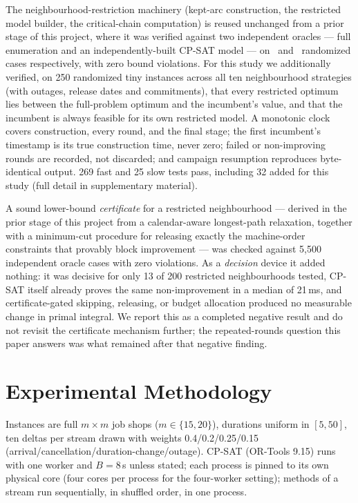 \documentclass[letterpaper]{article} %
\begin{document}
The neighbourhood-restriction machinery (kept-arc construction, the restricted model builder, the critical-chain computation) is reused unchanged from a prior stage of this project, where it was verified against two independent oracles --- full enumeration and an independently-built CP-SAT model --- on \OracleEnumCases\ and \OracleCpsatCases\ randomized cases respectively, with zero bound violations. For this study we additionally verified, on 250 randomized tiny instances across all ten neighbourhood strategies (with outages, release dates and commitments), that every restricted optimum lies between the full-problem optimum and the incumbent's value, and that the incumbent is always feasible for its own restricted model. A monotonic clock covers construction, every round, and the final stage; the first incumbent's timestamp is its true construction time, never zero; failed or non-improving rounds are recorded, not discarded; and campaign resumption reproduces byte-identical output. 269 fast and 25 slow tests pass, including 32 added for this study (full detail in supplementary material).

A sound lower-bound \emph{certificate} for a restricted neighbourhood --- derived in the prior stage of this project from a calendar-aware longest-path relaxation, together with a minimum-cut procedure for releasing exactly the machine-order constraints that provably block improvement --- was checked against 5{,}500 independent oracle cases with zero violations. As a \emph{decision} device it added nothing: it was decisive for only 13 of 200 restricted neighbourhoods tested, CP-SAT itself already proves the same non-improvement in a median of 21\,ms, and certificate-gated skipping, releasing, or budget allocation produced no measurable change in primal integral. We report this as a completed negative result and do not revisit the certificate mechanism further; the repeated-rounds question this paper answers was what remained after that negative finding.

\section{Experimental Methodology}

Instances are full $m\times m$ job shops ($m\in\{15,20\}$), durations uniform in $[5,50]$, ten deltas per stream drawn with weights 0.4/0.2/0.25/0.15 (arrival/cancellation/duration-change/outage). CP-SAT (OR-Tools 9.15) runs with one worker and $B=8$\,s unless stated; each process is pinned to its own physical core (four cores per process for the four-worker setting); methods of a stream run sequentially, in shuffled order, in one process.
\end{document}
